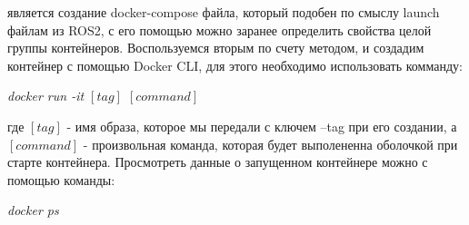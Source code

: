 \documentclass[a4paper, 14pt]{extreport}
\begin{document}
 является создание docker-compose файла, который подобен по смыслу launch файлам из ROS2, с его помощью можно заранее определить 
 свойства целой группы контейнеров. Воспользуемся вторым по счету методом, и создадим контейнер с помощью Docker CLI, для этого 
 необходимо использовать комманду:
\begin{center}
        \par \textsl{docker run -it $\left[tag\right]$ $\left[command\right]$}
\end{center}
\par\noindent где \(\left[tag\right]\) - имя образа, которое мы передали с ключем --tag при его создании, а \(\left[command\right]\) - 
произвольная команда, которая будет выполененна оболочкой при старте контейнера. Просмотреть данные о запущенном контейнере можно
с помощью команды:
\begin{center}
        \par \textsl{docker ps}
\end{center}
\end{document}
